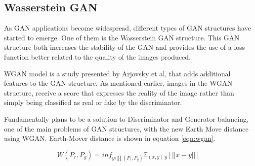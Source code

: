 \subsection{Wasserstein GAN}

As GAN applications become widespread, different types of GAN structures have started to emerge. One of them is the Wasserstein GAN structure. This GAN structure both increases the stability of the GAN and provides the use of a loss function better related to the quality of the images produced.

WGAN model is a study presented by Arjovsky et al\cite{wgan}, that adds additional features to the GAN structure. As mentioned earlier, images in the WGAN structure, receive a score that expresses the reality of the image rather than simply being classified as real or fake by the discriminator.

Fundamentally plans to be a solution to Discriminator and Generator balancing, one of the main problems of GAN structures, with the new Earth Move distance using WGAN. Earth-Mover distance is shown in equation \ref{eqn:wgan}.

\begin{equation}
\label{eqn:wgan}
    W(P_r, P_g)= {inf}_{y\epsilon\prod (P_r,P_g)}\mathbb{E}_{(x,y)~y}[||x-y||]
\end{equation}
